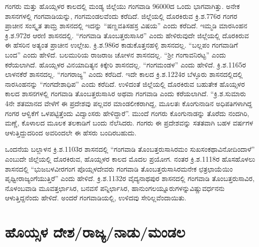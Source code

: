 ಗಂಗರು ಮತ್ತು ಹೊಯ್ಸಳರ ಕಾಲದಲ್ಲಿ ಮಂಡ್ಯ ಜಿಲ್ಲೆಯು ಗಂಗವಾಡಿ 96000ದ ಒಂದು ಭಾಗವಾಗಿತ್ತು. ಅನೇಕ ಶಾಸನಗಳಲ್ಲಿ ಗಂಗವಾಡಿಯನ್ನು, ಗಂಗಮಂಡಲವೆಂದು ಕರೆದಿದೆ. ಜಿಲ್ಲೆಯಲ್ಲಿ ದೊರಕಿರುವ ಕ್ರಿ.ಶ.776ರ ಗಂಗರ ಪ್ರಾಚೀನ ಸಂಸ್ಕೃತ ತಾಮ್ರ ಶಾಸನದಲ್ಲಿ ಇದನ್ನು “ಷಣ್ಣವತಿಸಹಸ್ರ ವಿಷಯ” ಎಂದು ಕರೆದಿದೆ. ಇಮ್ಮಡಿ ಮಾರಸಿಂಹನ ಕ್ರಿ.ಶ.972ರ ಆರಣಿ ಶಾಸನ\-ದಲ್ಲಿ. “ಗಂಗವಾಡಿ ತೊಂಬತ್ತರುಸಾಸಿರ” ಎಂದು ಹೇಳಿರುವುದೇ ಜಿಲ್ಲೆಯಲ್ಲಿ ದೊರಕಿರುವ ಈ ಹೆಸರಿನ ಅತ್ಯಂತ ಪ್ರಾಚೀನ ಉಲ್ಲೇಖ. ಕ್ರಿ.ಶ.986ರ ಕಾಡುಕೊತ್ತನಹಳ್ಳಿ ಶಾಸನದಲ್ಲ. “ಬಲ್ಲಪಂ ಗಂಗವಾಡಿಗೆ ಬಂದ” ಎಂದು ಹೇಳಿದೆ. ಬಲಮುರಿಯ ರಾಜರಾಜ ಚೋಳನ ಶಾಸನದಲ್ಲ. “ಶ‍್ರೀ ಗಂಗಾವನಿರಟ್ಟ” ಎಂದು ಕರೆಯಲಾಗಿದೆ. ಹೊಯ್ಸಳರ ವಿನಯಾದಿತ್ಯನ ಕಿಕ್ಕೇರಿ ಶಾಸನದಲ್ಲ. “ಗಂಗಮಂಡಳ” ಎಂದು ಹೇಳಿದೆ. ಕ್ರಿ.ಶ.1165ರ ಲಾಳನಕೆರೆ ಶಾಸನದಲ್ಲ. “ಗಂಗರಾಜ್ಯ” ಎಂದು ಕರೆದಿದೆ. ಇದೇ ಕಾಲದ ಕ್ರಿ.ಶ.1224ರ ಬೆಳ್ಳೂರು ಶಾಸನದಲ್ಲಿದಲ್ಲಿ ನಾರಸಿಂಹನನ್ನು “ಗಂಗದೇಶಾಧಿಪ” ಎಂದು ಕರೆದಿದೆ. ಉಳಿದಂತೆ ಜಿಲ್ಲೆಯಲ್ಲಿ ದೊರಕಿರುವ ಬಹುತೇಕ ಹೊಯ್ಸಳರ ಕಾಲದ ಶಾಸನಗಳಲ್ಲಿ ಗಂಗವಾಡಿ ತೊಂಬತ್ತರುಸಾಸಿರ ಅಥವಾ ಗಂಗವಾಡಿ ಎಂದು ಕರೆಯಲಾಗಿದೆ. “ಕ್ರಿ.ಶ.ಸುಮಾರು 4ನೇ ಶತಮಾನದ ವೇಳೆಗೆ ಈ ಪ್ರದೇಶವು ಪಲ್ಲವರ ಮಾಂಡಲೀಕರಾಗಿದ್ದ, ಮೂಲತಃ ಕೊಂಗುನಾಡಿನ ಅಧಿಪತಿಗಳಾಗಿದ್ದ ಗಂಗರ ಆಳ್ವಿಕೆಗೆ ಒಳಪಟ್ಟಿತ್ತೆಂದು ವಿದ್ವಾಂಸರು ಹೇಳಿದ್ದಾರೆ”. ಮುಂದೆ ಗಂಗರು ಕೊಂಗುನಾಡನ್ನು ತೊರೆದು ನಂದಗಿರಿ, ಮಣ್ಣೆ, ಕೊಳಾಲದ ಮೂಲಕ ತಲಕಾಡಿಗೆ ಬಂದು ನೆಲೆಸಿದರು. ಗಂಗರು ಈ ಪ್ರದೇಶವನ್ನು ಸತತವಾಗಿ ಬಹಳ ವರ್ಷಗಳ ಆಳುತ್ತಿದ್ದುದರಿಂದ ಅವರಿಂದಲೇ ಈ ಹೆಸರು ಬಂದಿರಬಹುದು.

ಒಂದನೆಯ ಬಲ್ಲಾಳನ ಕ್ರಿ.ಶ.1103ರ ಶಾಸನದಲ್ಲಿ “ಗಂಗವಾಡಿ ತೊಂಬತ್ತರುಸಾಸಿರಮಂ ಸುಖಸಂಕಥಾ\break ವಿನೋದಿಂದಾಳೆ” ಎಂಬುದೇ ಜಿಲ್ಲೆಯಲ್ಲಿ ದೊರಕಿರುವ, ಹೊಯ್ಸಳರ ಕಾಲದ ಮೊದಲ ಪ್ರಯೋಗ. ನಂತರ ಕ್ರಿ.ಶ.1118ರ ಹೊಸಹೊಳಲು ಶಾಸನದಲ್ಲಿ “ಭುಜಬಳವೀರಗಂಗ ಪೊಯ್ಸಳದೇವರು ಗಂಗವಾಡಿ ತೊಂಬತ್ತರುಸಾಸಿರಮನೇಕ ಛತ್ರ\break ಛಾಯೆಯಿಂ ಪೃಥ್ವೀರಾಜ್ಯಂಗೆಯುತ್ತಿರೆ” ಎಂದು ಹೇಳಿದೆ. ಕ್ರಿ.ಶ.1132ರ ವೈದ್ಯನಾಥಪುರ ಶಾಸನದಲ್ಲಿ ಗಂಗವಾಡಿ ತೊಂಬತ್ತರುಸಾವಿರ, ನೊಳಂಬವಾಡಿ ಮೂವತ್ತರ್ಛಾಸಿರ, ಬನವಸೆ ಪನ್ನಿರ್ಛಾಸಿರ, ಹಾನುಂಗಲಯ್ನೂರುಗಳನ್ನು\break ವಿಷ್ಣುವರ್ಧನನು ಆಳುತ್ತಿದ್ದನೆಂದು ಹೇಳಿದೆ. ಅಂದರೆ ಗಂಗವಾಡಿಯಲ್ಲಿ, ಉಳಿದವು ಸೇರಿಲ್ಲವೆಂದಾಯಿತು.

\section{ಹೊಯ್ಸಳ ದೇಶ/ರಾಜ್ಯ/ನಾಡು/ಮಂಡಲ}

